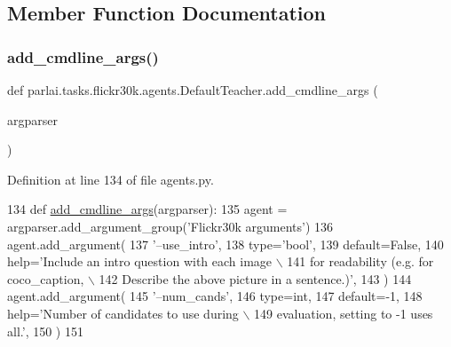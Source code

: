 \subsection{Member Function Documentation}
\mbox{\label{classparlai_1_1tasks_1_1flickr30k_1_1agents_1_1DefaultTeacher_a6a4661fe44f7b4c0d0e8329218bc15f6}} 
\subsubsection{\texorpdfstring{add\+\_\+cmdline\+\_\+args()}{add\_cmdline\_args()}}
{\footnotesize\ttfamily def parlai.\+tasks.\+flickr30k.\+agents.\+Default\+Teacher.\+add\+\_\+cmdline\+\_\+args (\begin{DoxyParamCaption}\item[{}]{argparser }\end{DoxyParamCaption})\hspace{0.3cm}{\ttfamily [static]}}



Definition at line 134 of file agents.\+py.


\begin{DoxyCode}
134     \textcolor{keyword}{def }\hyperlink{namespaceparlai_1_1agents_1_1drqa_1_1config_a62fdd5554f1da6be0cba185271058320}{add\_cmdline\_args}(argparser):
135         agent = argparser.add\_argument\_group(\textcolor{stringliteral}{'Flickr30k arguments'})
136         agent.add\_argument(
137             \textcolor{stringliteral}{'--use\_intro'},
138             type=\textcolor{stringliteral}{'bool'},
139             default=\textcolor{keyword}{False},
140             help=\textcolor{stringliteral}{'Include an intro question with each image \(\backslash\)}
141 \textcolor{stringliteral}{                                for readability (e.g. for coco\_caption, \(\backslash\)}
142 \textcolor{stringliteral}{                                Describe the above picture in a sentence.)'},
143         )
144         agent.add\_argument(
145             \textcolor{stringliteral}{'--num\_cands'},
146             type=int,
147             default=-1,
148             help=\textcolor{stringliteral}{'Number of candidates to use during \(\backslash\)}
149 \textcolor{stringliteral}{                                evaluation, setting to -1 uses all.'},
150         )
151 
\end{DoxyCode}
\mbox{\label{classparlai_1_1tasks_1_1flickr30k_1_1agents_1_1DefaultTeacher_a55dc5ed3f7e99ad143248a9fba87e2b2}} 
